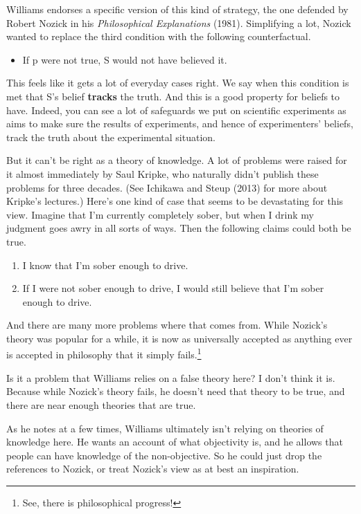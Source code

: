 \documentclass[
]{article}
\providecommand{\tightlist}{%
  \setlength{\itemsep}{0pt}\setlength{\parskip}{0pt}}
\begin{document}
Williams endorses a specific version of this kind of strategy, the one
defended by Robert Nozick in his \emph{Philosophical Explanations}
(1981). Simplifying a lot, Nozick wanted to replace the third condition
with the following counterfactual.

\begin{itemize}
\tightlist
\item
  If p were not true, S would not have believed it.
\end{itemize}

This feels like it gets a lot of everyday cases right. We say when this
condition is met that S's belief \textbf{tracks} the truth. And this is
a good property for beliefs to have. Indeed, you can see a lot of
safeguards we put on scientific experiments as aims to make sure the
results of experiments, and hence of experimenters' beliefs, track the
truth about the experimental situation.

But it can't be right as a theory of knowledge. A lot of problems were
raised for it almost immediately by Saul Kripke, who naturally didn't
publish these problems for three decades. (See Ichikawa and Steup (2013)
for more about Kripke's lectures.) Here's one kind of case that seems to
be devastating for this view. Imagine that I'm currently completely
sober, but when I drink my judgment goes awry in all sorts of ways. Then
the following claims could both be true.

\begin{enumerate}
\def\labelenumi{\arabic{enumi}.}
\tightlist
\item
  I know that I'm sober enough to drive.
\item
  If I were not sober enough to drive, I would still believe that I'm
  sober enough to drive.
\end{enumerate}

And there are many more problems where that comes from. While Nozick's
theory was popular for a while, it is now as universally accepted as
anything ever is accepted in philosophy that it simply fails.\footnote{See,
  there is philosophical progress!}

Is it a problem that Williams relies on a false theory here? I don't
think it is. Because while Nozick's theory fails, he doesn't need that
theory to be true, and there are near enough theories that are true.

As he notes at a few times, Williams ultimately isn't relying on
theories of knowledge here. He wants an account of what objectivity is,
and he allows that people can have knowledge of the non-objective. So he
could just drop the references to Nozick, or treat Nozick's view as at
best an inspiration.
\end{document}
